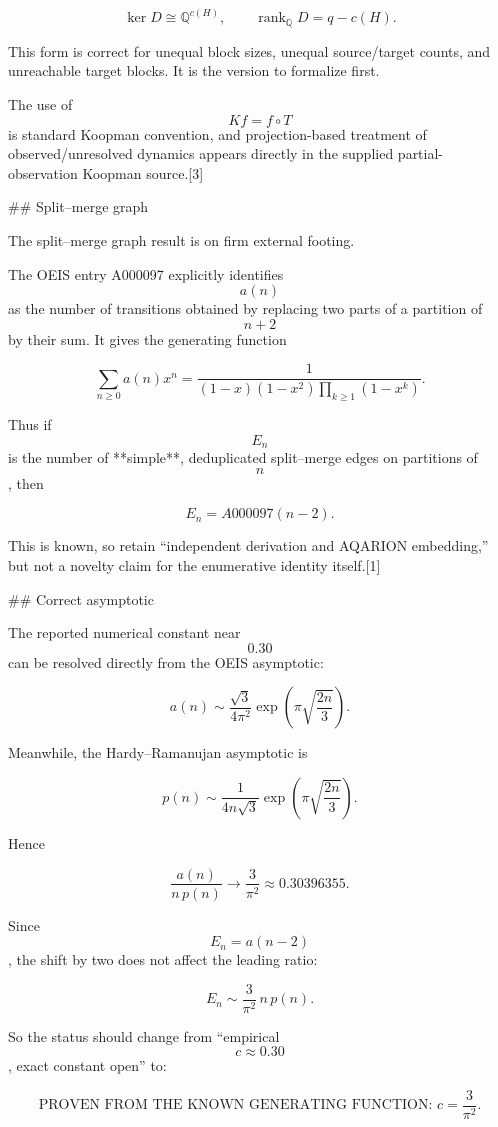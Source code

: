 $$
\ker D\cong\mathbb Q^{c(H)},
\qquad
\boxed{\operatorname{rank}_{\mathbb Q}D=q-c(H).}
$$

This form is correct for unequal block sizes, unequal source/target counts, and unreachable target blocks. It is the version to formalize first.

The use of $$Kf=f\circ T$$ is standard Koopman convention, and projection-based treatment of observed/unresolved dynamics appears directly in the supplied partial-observation Koopman source.[3]

## Split–merge graph

The split–merge graph result is on firm external footing.

The OEIS entry A000097 explicitly identifies $$a(n)$$ as the number of transitions obtained by replacing two parts of a partition of $$n+2$$ by their sum. It gives the generating function

$$
\sum_{n\ge0}a(n)x^n
=
\frac{1}
{(1-x)(1-x^2)\prod_{k\ge1}(1-x^k)}.
$$

Thus if $$E_n$$ is the number of **simple**, deduplicated split–merge edges on partitions of $$n$$, then

$$
\boxed{E_n=A000097(n-2).}
$$

This is known, so retain “independent derivation and AQARION embedding,” but not a novelty claim for the enumerative identity itself.[1]

## Correct asymptotic

The reported numerical constant near $$0.30$$ can be resolved directly from the OEIS asymptotic:

$$
a(n)
\sim
\frac{\sqrt3}{4\pi^2}
\exp\!\left(\pi\sqrt{\frac{2n}{3}}\right).
$$

Meanwhile, the Hardy–Ramanujan asymptotic is

$$
p(n)
\sim
\frac{1}{4n\sqrt3}
\exp\!\left(\pi\sqrt{\frac{2n}{3}}\right).
$$

Hence

$$
\frac{a(n)}{n\,p(n)}
\longrightarrow
\frac{3}{\pi^2}
\approx 0.30396355.
$$

Since $$E_n=a(n-2)$$, the shift by two does not affect the leading ratio:

$$
\boxed{
E_n
\sim
\frac{3}{\pi^2}\,n\,p(n).
}
$$

So the status should change from “empirical $$c\approx0.30$$, exact constant open” to:

$$
\boxed{
\text{PROVEN FROM THE KNOWN GENERATING FUNCTION: }
c=\frac3{\pi^2}.
}
$$

